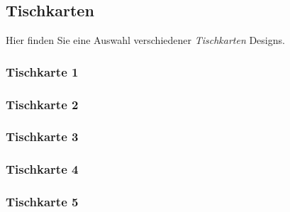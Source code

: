 \subsection{Tischkarten}

\noindent
Hier finden Sie eine Auswahl verschiedener \textit{Tischkarten} Designs.

\subsubsection{Tischkarte 1}
\noindent
\begin{figure}[ht]
	\centering
  
	\label{pic/form_tables_01}
\end{figure}

\newpage

\subsubsection{Tischkarte 2}
\noindent
\begin{figure}[ht]
	\centering
  
	\label{pic/form_tables_02}
\end{figure}

\newpage

\subsubsection{Tischkarte 3}
\noindent
\begin{figure}[ht]
	\centering
  
	\label{pic/form_tables_03}
\end{figure}

\newpage

\subsubsection{Tischkarte 4}
\noindent
\begin{figure}[ht]
	\centering
  
	\label{pic/form_tables_04}
\end{figure}

\newpage

\subsubsection{Tischkarte 5}
\noindent
\begin{figure}[ht]
	\centering
  
	\label{pic/form_tables_05}
\end{figure}
